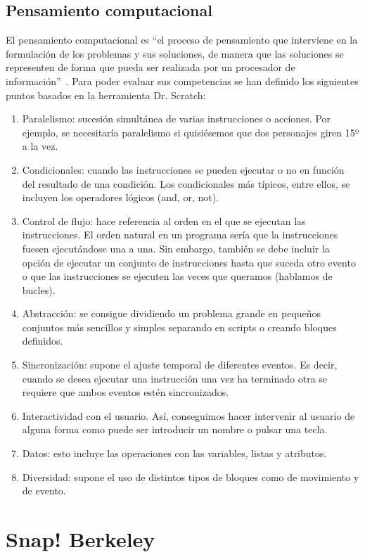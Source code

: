 \documentclass[a4paper, 12pt]{book}
\begin{document}
\subsection{Pensamiento computacional}
El pensamiento computacional es ``el proceso de pensamiento que interviene en la formulación de los problemas y sus soluciones, de manera que las soluciones se representen de forma que pueda ser realizada por un procesador de información''~\cite{wing2011research}. Para poder evaluar sus competencias se han definido los siguientes puntos basados en la herramienta Dr. Scratch:
\begin{enumerate}[1)]
    \item Paralelismo: sucesión simultánea de varias instrucciones o acciones. Por ejemplo, se necesitaría paralelismo si quisiésemos que dos personajes giren 15º a la vez.
    \item Condicionales: cuando las instrucciones se pueden ejecutar o no en función del resultado de una condición. Los condicionales más típicos, entre ellos, se incluyen los operadores lógicos (and, or, not).
    \item Control de flujo: hace referencia al orden en el que se ejecutan las instrucciones. El orden natural en un programa sería que la instrucciones fuesen ejecutándose una a una. Sin embargo, también se debe incluir la opción de ejecutar un conjunto de instrucciones hasta que suceda otro evento o que las instrucciones se ejecuten las veces que queramos (hablamos de bucles).
    \item Abstracción: se consigue dividiendo un problema grande en pequeños conjuntos más sencillos y simples separando en scripts o creando bloques definidos.
    \item Sincronización: supone el ajuste temporal de diferentes eventos. Es decir, cuando se desea ejecutar una instrucción una vez ha terminado otra se requiere que ambos eventos estén sincronizados.
    \item Interactividad con el usuario. Así, conseguimos hacer intervenir al usuario de alguna forma como puede ser introducir un nombre o pulsar una tecla.
    \item Datos: esto incluye las operaciones con las variables, listas y atributos.
    \item Diversidad: supone el uso de distintos tipos de bloques como de movimiento y de evento.
\end{enumerate}

\section{Snap! Berkeley}
\end{document}
